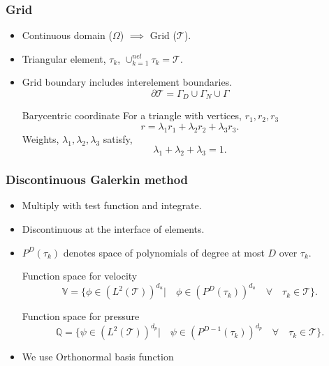 \documentclass{beamer}
\begin{document}
\begin{frame}
\frametitle{Grid}
\begin{itemize}
\item Continuous domain ($\Omega$) $\implies$ Grid ($\mathcal{T}$).
\item Triangular element, $\tau_k$, $\cup_{k=1}^{nel} \tau_k = \mathcal{T}$.
\item Grid boundary includes interelement boundaries.
\begin{equation}
\partial \mathcal{T} = \Gamma_D \cup \Gamma_N \cup \Gamma
\end{equation}

\begin{block}{Barycentric coordinate}
For a triangle with vertices, $r_1, r_2, r_3$
\begin{equation}\label{barycentric point}
r = \lambda_1 r_1 + \lambda_2 r_2 + \lambda_3 r_3 \textrm{.}
\end{equation}
Weights, $\lambda_1, \lambda_2, \lambda_3$ satisfy,
\begin{equation}\label{lambda constraint} 
\lambda_1 + \lambda_2 + \lambda_3 = 1 \textrm{.}
\end{equation}
\end{block}

\end{itemize}
\end{frame}


\begin{frame}
\frametitle{Discontinuous Galerkin method}
\begin{itemize}
\item Multiply with test function and integrate.
\item Discontinuous at the interface of elements.
\item $P^D(\tau_k)$ denotes space of polynomials of degree at most $D$ over $\tau_k$.

\begin{block}{Function space for velocity}
\begin{equation}
\mathbb{V} = \lbrace \phi \in (L^2(\mathcal{T}))^{d_u}| \quad \phi \in (P^D(\tau_k))^{d_u} \quad \forall \quad {\tau_k} \in \mathcal{T} \rbrace \textrm{.}
\end{equation}
\end{block}

\begin{block}{Function space for pressure}
\begin{equation}
\mathbb{Q} = \lbrace \psi \in (L^2(\mathcal{T}))^{d_p}| \quad \psi \in (P^{D-1}(\tau_k))^{d_p} \quad \forall \quad {\tau_k} \in \mathcal{T} \rbrace \textrm{.}
\end{equation}
\end{block}
\item We use Orthonormal basis function
\end{itemize}
\end{frame}
\end{document}

